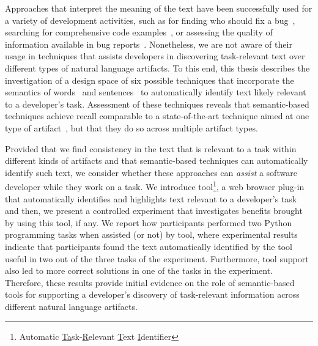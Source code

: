Approaches that interpret the meaning of the text have been successfully used for a variety of development activities,
such as for finding who should fix a bug~\cite{yang2016}, searching for comprehensive code examples~\cite{silva2019}, or assessing the quality of information available in bug reports~\cite{chaparro2019}.
Nonetheless, we are not aware of their usage in techniques 
that assists developers in discovering task-relevant text over different types of natural language artifacts.
To this end, this thesis describes the investigation of a design space
of six possible techniques that incorporate the semantics of words~\cite{Mikolov2013, Devlin2018Bert}
and sentences~\cite{fillmore1976frame, marques2021}
to automatically identify text likely relevant to a developer's task.
Assessment of these techniques reveals that semantic-based techniques
achieve recall comparable to a state-of-the-art technique aimed at one type of artifact~\cite{Xu2017}, but 
that they do so across
multiple artifact types.








Provided that we find consistency in the text  that is relevant to a task within different kinds of artifacts and that semantic-based techniques can automatically identify such text, 
we consider whether these approaches can \textit{assist} a software developer while they work on a task.
We introduce \acs{tool}\footnote{
    Automatic \underline{Ta}sk-\underline{R}elevant \underline{T}ext \underline{I}dentifier
}, a web browser plug-in that 
automatically identifies and highlights text relevant to a developer's task 
and then, we present a controlled experiment that investigates benefits brought by using this tool, if any.
We report how  participants 
performed two Python programming tasks when 
 assisted (or not) by \acs{tool},
where experimental results indicate that participants found the text automatically identified
by the tool 
useful in two out of the three tasks of the experiment.
Furthermore, tool support also led to more correct solutions 
in one of the tasks in the experiment. Therefore, these results provide
initial evidence on the role of semantic-based tools 
for supporting a developer's discovery of task-relevant information
across different natural language artifacts.







